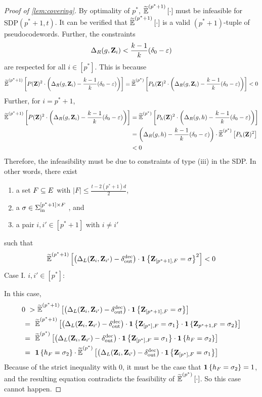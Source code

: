 \begin{proof}[Proof of \cref{lem:covering}]
	By optimality of $p^*$, $\pcod{p^*+1}{\cdot}$ must be infeasible for $\mathrm{SDP}(p^*+1,t)$. It can be verified that $\pcod{p^*+1}{\cdot}$ is a valid $(p^*+1)$-tuple of pseudocodewords. Further, the constraints 
	\[
		\Delta_R(g,\zee_i) < \frac{k-1}{k}(\delta_0 - \eps)
	\]
	are respected for all $i\in [p^*]$. This is because 
	\[
		\pcod{p^*+1}{P(\zee)^2 \cdot \inparen{\Delta_R(g,\zee_i) - \frac{k-1}{k}(\delta_0 - \eps)}} = \pcod{p^*}{P_h(\zee)^2 \cdot \inparen{\Delta_R(g,\zee_i) - \frac{k-1}{k}(\delta_0 - \eps)}} < 0
	\]
	Further, for $i=p^*+1$,
	\begin{align*}
		\pcod{p^*+1}{P(\zee)^2 \cdot \inparen{\Delta_R(g,\zee_i) - \frac{k-1}{k}(\delta_0 - \eps)}} &= \pcod{p^*}{P_h(\zee)^2 \cdot \inparen{\Delta_R(g,h) - \frac{k-1}{k}(\delta_0 - \eps)}} \\
		&= \inparen{\Delta_R(g,h) - \frac{k-1}{k}(\delta_0 - \eps)} \cdot \pcod{p^*}{P_h(\zee)^2} \\
		&< 0
	\end{align*}
	Therefore, the infeasibility must be due to constraints of type (iii) in the SDP. In other words, there exist
	\begin{enumerate}
	\item a set $F\sub E$ with $|F|\leq \frac{t-2(p^*+1)d}{2}$,
	\item a $\sigma \in \Sigma_{\inn}^{[p^*+1]\times F}$ 
	, and 
	\item a pair $i,i'\in [p^*+1]$ with $i\neq i'$
	\end{enumerate}
	such that
	\[
		\pcod{p^*+1}{ \inparen{\Delta_L(\zee_i,\zee_{i'}) - \delta_{\out}^{\dec}} \cdot \indi{\zee_{[p^*+1],F} = \sigma}^2} < 0
	\]
	Case I. $i,i' \in [p^*]$:
	
	In this case,
	\begin{align*}
		0~>&~ \pcod{p^*+1}{ \inparen{\Delta_L(\zee_i,\zee_{i'}) - \delta_{\out}^{\dec}} \cdot \indi{\zee_{[p^*+1],F} = \sigma}} \\
		=~~ & \pcod{p^*+1}{ \inparen{\Delta_L(\zee_i,\zee_{i'}) - \delta_{\out}^{\dec}} \cdot \indi{\zee_{[p^*],F} = \sigma_1} \cdot \indi{\zee_{p^*+1,F} = \sigma_2}} \\
		=~~ & \pcod{p^*}{ \inparen{\Delta_L(\zee_i,\zee_{i'}) - \delta_{\out}^{\dec}} \cdot \indi{\zee_{[p^*],F} = \sigma_1} \cdot \indi{h_F = \sigma_2}} \\
		=~~ & \indi{h_F = \sigma_2} \cdot \pcod{p^*}{ \inparen{\Delta_L(\zee_i,\zee_{i'}) - \delta_{\out}^{\dec}} \cdot \indi{\zee_{[p^*],F} = \sigma_1} }
	\end{align*}
Because of the strict inequality with $0$, it must be the case that $\indi{h_F = \sigma_2} =1$, and the resulting equation contradicts the feasibility of $\pcod{p^*}{\cdot}$. So this case cannot happen.


\end{proof}
